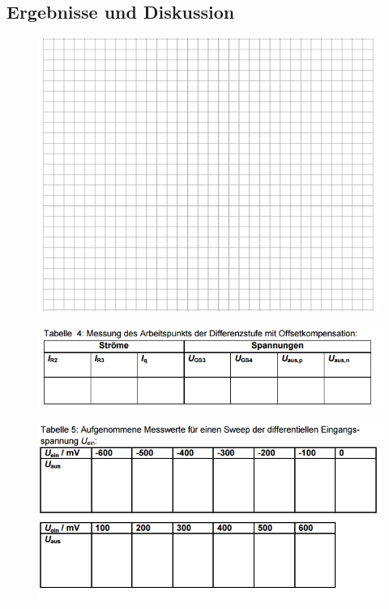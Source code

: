 \subsection{Ergebnisse und Diskussion}
\begin{figure}[!ht]
\begin{center}
\includegraphics[scale=0.8]{Text}
\end{center}
\end{figure}
\begin{figure}[!ht]
\begin{center}
\includegraphics[scale=0.8]{Tabelle4}
\end{center}
\end{figure}
\begin{figure}[!ht]
\begin{center}
\includegraphics[scale=0.8]{Tabelle5}
\end{center}
\end{figure}
